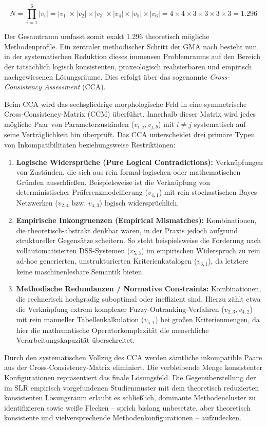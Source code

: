 \begin{equation}
\label{eq:konfigurationsraum}
N = \prod_{i=1}^6 |v_i| = |v_1| \times |v_2| \times |v_3| \times |v_4| \times |v_5| \times |v_6| = 4 \times 4 \times 3 \times 3 \times 3 \times 3 = 1.296
\end{equation}

Der Gesamtraum umfasst somit exakt 1.296 theoretisch mögliche Methodenprofile. Ein zentraler methodischer Schritt der GMA nach \cite{Z6N6V5L9} besteht nun in der systematischen Reduktion dieses immensen Problemraums auf den Bereich der tatsächlich logisch konsistenten, praxeologisch realisierbaren und empirisch nachgewiesenen Lösungsräume. Dies erfolgt über das sogenannte \textit{Cross-Consistency Assessment} (CCA).

Beim CCA wird das sechsgliedrige morphologische Feld in eine symmetrische Cross-Consistency-Matrix (CCM) überführt. Innerhalb dieser Matrix wird jedes mögliche Paar von Parameterzuständen ($v_{i,a}, v_{j,b}$) mit $i \neq j$ systematisch auf seine Verträglichkeit hin überprüft. Das CCA unterscheidet drei primäre Typen von Inkompatibilitäten beziehungsweise Restriktionen:

\begin{enumerate}
    \item \textbf{Logische Widersprüche (Pure Logical Contradictions):} Verknüpfungen von Zuständen, die sich aus rein formal-logischen oder mathematischen Gründen ausschließen. Beispielsweise ist die Verknüpfung von deterministischer Präferenzmodellierung ($v_{4,1}$) mit rein stochastischen Bayes-Netzwerken ($v_{2,4}$ bzw. $v_{4,3}$) logisch widersprüchlich.
    \item \textbf{Empirische Inkongruenzen (Empirical Mismatches):} Kombinationen, die theoretisch-abstrakt denkbar wären, in der Praxis jedoch aufgrund struktureller Gegensätze scheitern. So steht beispielsweise die Forderung nach vollautomatisierten DSS-Systemen ($v_{5,3}$) im empirischen Widerspruch zu rein ad-hoc generierten, unstrukturierten Kriterienkatalogen ($v_{3,1}$), da letztere keine maschinenlesbare Semantik bieten.
    \item \textbf{Methodische Redundanzen / Normative Constraints:} Kombinationen, die rechnerisch hochgradig suboptimal oder ineffizient sind. Hierzu zählt etwa die Verknüpfung extrem komplexer Fuzzy-Outranking-Verfahren ($v_{2,3}, v_{4,2}$) mit rein manueller Tabellenkalkulation ($v_{5,1}$) bei großen Kriterienmengen, da hier die mathematische Operatorkomplexität die menschliche Verarbeitungskapazität überschreitet.
\end{enumerate}

Durch den systematischen Vollzug des CCA werden sämtliche inkompatible Paare aus der Cross-Consistency-Matrix eliminiert. Die verbleibende Menge konsistenter Konfigurationen repräsentiert das finale Lösungsfeld. Die Gegenüberstellung der im SLR empirisch vorgefundenen Studienmuster mit dem theoretisch reduzierten konsistenten Lösungsraum erlaubt es schließlich, dominante Methodencluster zu identifizieren sowie weiße Flecken -- sprich bislang unbesetzte, aber theoretisch konsistente und vielversprechende Methodenkonfigurationen -- aufzudecken.
